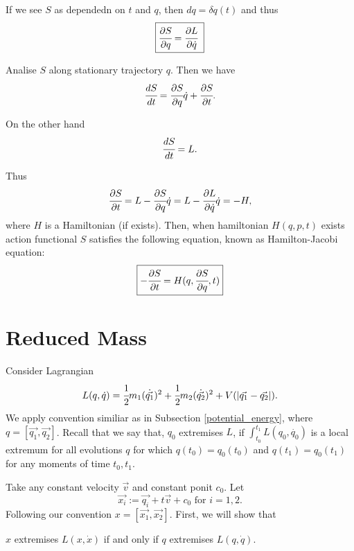 \documentclass[main.tex]{subfiles}
\begin{document}
If we see $S$ as dependedn on $t$ and $q$, then $dq = \delta q(t)$ and thus
\begin{equation}
\label{canonical-momentum-for-action}
\boxed{
\cfrac{\partial S}{\partial q} = \cfrac{\partial L} {\partial \dot{q}}\
}
\end{equation}

Analise $S$ along stationary trajectory $q$. Then we have
\begin{equation}
\cfrac{dS}{dt} = \cfrac{\partial S}{\partial q}\dot{q} + \cfrac{\partial S}{\partial t}.
\end{equation}

On the other hand 
\begin{equation}
\cfrac{d S}{d t} = L.
\end{equation}

Thus
\begin{equation}
\cfrac{\partial S}{\partial t} = L - \cfrac{\partial S}{\partial q}\dot{q} = L - \cfrac{\partial L} {\partial \dot{q}} \dot{q} = -H,
\end{equation}
where $H$ is a Hamiltonian (if exists). 
Then, when hamiltonian $H(q, p, t)$ exists action functional $S$ satisfies the following equation, known as Hamilton-Jacobi equation:
\begin{equation}
\label{hamilton-jacobi-equation}
\boxed{
-\cfrac{\partial S}{\partial t} = H(q, \cfrac{\partial S}{\partial q}, t)
}
\end{equation}

\section{Reduced Mass}
Consider Lagrangian
\begin{equation}
\label{lagrangian-dist-dependent}
L(q, \dot{q}) = \cfrac{1}{2}m_1 (\dot{\vec{q_1}})^2 + \cfrac{1}{2}m_2 (\dot{\vec{q_2}})^2 + V(|\vec{q_1} - \vec{q_2}|).
\end{equation}
We apply convention similiar as in Subsection \ref{potential_energy}, where $q=[\vec{q_1}, \vec{q_2}]$.
Recall that we say that, $q_0$ extremises $L$, if $\int_{t_0}^{t_1} L(q_0, \dot{q_0})$ is a local extremum for all evolutions $q$ for which $q(t_0) = q_0(t_0)$ and $q(t_1) = q_0(t_1)$ for any moments of time $t_0, t_1$.

Take any constant velocity $\vec{v}$ and constant ponit $c_0$. Let
\begin{equation}
\label{inertial-coordinates-change}
\vec{x_i} := \vec{q_i} + t\vec{v} + c_0 \text{ for } i=1,2.
\end{equation}
Following our convention $x=[\vec{x_1}, \vec{x_2}]$. First, we will show that 
\begin{fact}
$x$ extremises $L(x, \dot{x})$ if and only if $q$ extremises $L(q, \dot{q})$.
\end{fact}
\end{document}
